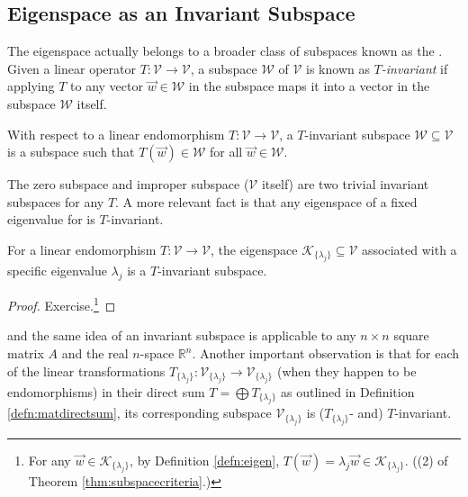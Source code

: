 \subsection{Eigenspace as an Invariant Subspace}
The eigenspace actually belongs to a broader class of subspaces known as the . Given a linear operator $T:\mathcal{V} \to \mathcal{V}$, a subspace $\mathcal{W}$ of $\mathcal{V}$ is known as \textit{$T$-invariant} if applying $T$ to any vector $\vec{w} \in \mathcal{W}$ in the subspace maps it into a vector in the subspace $\mathcal{W}$ itself.
\begin{defn}
With respect to a linear endomorphism $T:\mathcal{V} \to \mathcal{V}$, a $T$-invariant subspace $\mathcal{W} \subseteq \mathcal{V}$ is a subspace such that $T(\vec{w}) \in \mathcal{W}$ for all $\vec{w} \in \mathcal{W}$.
\end{defn}
The zero subspace and improper subspace ($\mathcal{V}$ itself) are two trivial invariant subspaces for any $T$. A more relevant fact is that any eigenspace of a fixed eigenvalue for is $T$-invariant.
\begin{proper}
\label{proper:eigenTinvariant}
For a linear endomorphism $T:\mathcal{V} \to \mathcal{V}$, the eigenspace $\mathcal{K}_{\{\lambda_j\}} \subseteq \mathcal{V}$ associated with a specific eigenvalue $\lambda_j$ is a $T$-invariant subspace.
\end{proper}
\begin{proof}
Exercise.\footnote{For any $\vec{w} \in \mathcal{K}_{\{\lambda_j\}}$, by Definition \ref{defn:eigen}, $T(\vec{w}) = \lambda_j \vec{w} \in \mathcal{K}_{\{\lambda_j\}}$. ((2) of Theorem \ref{thm:subspacecriteria}.)}
\end{proof}
and the same idea of an invariant subspace is applicable to any $n \times n$ square matrix $A$ and the real $n$-space $\mathbb{R}^n$. Another important observation is that for each of the linear transformations $T_{\{\lambda_j\}}: \mathcal{V}_{\{\lambda_j\}} \to \mathcal{V}_{\{\lambda_j\}}$ (when they happen to be endomorphisms) in their direct sum $T = \bigoplus T_{\{\lambda_j\}}$ as outlined in Definition \ref{defn:matdirectsum}, its corresponding subspace $\mathcal{V}_{\{\lambda_j\}}$ is ($T_{\{\lambda_j\}}$- and) $T$-invariant.

